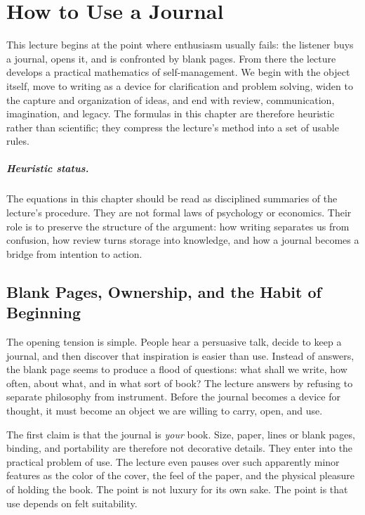 \chapter{How to Use a Journal}

This lecture begins at the point where enthusiasm usually fails: the listener buys a journal, opens it, and is confronted by blank pages. From there the lecture develops a practical mathematics of self-management. We begin with the object itself, move to writing as a device for clarification and problem solving, widen to the capture and organization of ideas, and end with review, communication, imagination, and legacy. The formulas in this chapter are therefore heuristic rather than scientific; they compress the lecture's method into a set of usable rules.

\paragraph{Heuristic status.}
The equations in this chapter should be read as disciplined summaries of the lecture's procedure. They are not formal laws of psychology or economics. Their role is to preserve the structure of the argument: how writing separates us from confusion, how review turns storage into knowledge, and how a journal becomes a bridge from intention to action.

\section{Blank Pages, Ownership, and the Habit of Beginning}

The opening tension is simple. People hear a persuasive talk, decide to keep a journal, and then discover that inspiration is easier than use. Instead of answers, the blank page seems to produce a flood of questions: what shall we write, how often, about what, and in what sort of book? The lecture answers by refusing to separate philosophy from instrument. Before the journal becomes a device for thought, it must become an object we are willing to carry, open, and use.

The first claim is that the journal is \emph{your} book. Size, paper, lines or blank pages, binding, and portability are therefore not decorative details. They enter into the practical problem of use. The lecture even pauses over such apparently minor features as the color of the cover, the feel of the paper, and the physical pleasure of holding the book. The point is not luxury for its own sake. The point is that use depends on felt suitability.

